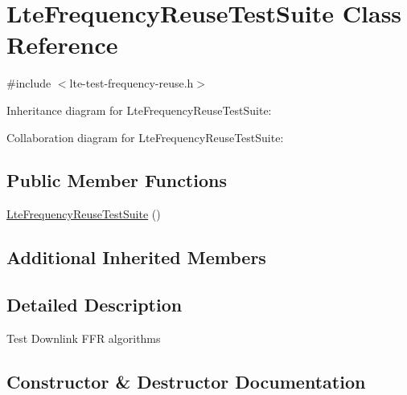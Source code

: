 \hypertarget{classLteFrequencyReuseTestSuite}{}\section{Lte\+Frequency\+Reuse\+Test\+Suite Class Reference}
\label{classLteFrequencyReuseTestSuite}


{\ttfamily \#include $<$lte-\/test-\/frequency-\/reuse.\+h$>$}



Inheritance diagram for Lte\+Frequency\+Reuse\+Test\+Suite\+:


Collaboration diagram for Lte\+Frequency\+Reuse\+Test\+Suite\+:
\subsection*{Public Member Functions}
\begin{DoxyCompactItemize}
\item 
\hyperlink{classLteFrequencyReuseTestSuite_ab553b04edb151494ccf5490c8c3cb1bd}{Lte\+Frequency\+Reuse\+Test\+Suite} ()
\end{DoxyCompactItemize}
\subsection*{Additional Inherited Members}


\subsection{Detailed Description}
Test Downlink F\+FR algorithms 

\subsection{Constructor \& Destructor Documentation}
